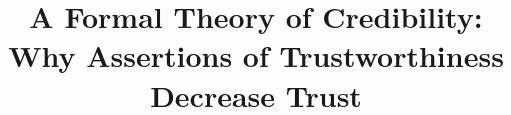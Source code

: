 \documentclass[11pt]{article}
\title{A Formal Theory of Credibility:\\
Why Assertions of Trustworthiness Decrease Trust}
\begin{document}
\maketitle
\paperfooter

\begin{abstract}

\end{abstract}












\nocite{*}


\end{document}
